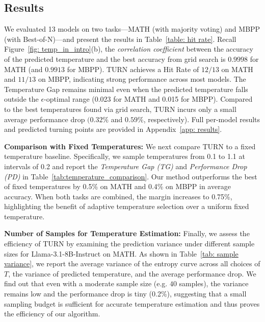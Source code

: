 \subsection{Results}  
We evaluated 13 models on two tasks—MATH (with majority voting) and MBPP (with Best-of-N)—and present the results in Table~\ref{table: hit rate}. Recall Figure~\ref{fig: temp_in_intro}(b), the \emph{correlation coefficient} between the accuracy of the predicted temperature and the best accuracy from grid search is $0.9998$ for MATH (and $0.9913$ for MBPP). \textsc{TURN} achieves a Hit Rate of \(12/13\) on MATH and \(11/13\) on MBPP, indicating strong performance across most models. The Temperature Gap remains minimal even when the predicted temperature falls outside the $\epsilon$-optimal range (0.023 for MATH and 0.015 for MBPP). Compared to the best temperatures found via grid search, \textsc{TURN} incurs only a small average performance drop \((0.32\%\) and \(0.59\%\), respectively). Full per-model results and predicted turning points are provided in Appendix~\ref{app: results}.

\textbf{Comparison with Fixed Temperatures:} 
We next compare \textsc{TURN} to a fixed temperature baseline. Specifically, we sample temperatures from 0.1 to 1.1 at intervals of 0.2 and report the \emph{Temperature Gap (TG)} and \emph{Performance Drop (PD)} in Table~\ref{tab:temperature_comparison}. Our method outperforms the best of fixed temperatures by 0.5\% on MATH and 0.4\% on MBPP in average accuracy. When both tasks are combined, the margin increases to 0.75\%, highlighting the benefit of adaptive temperature selection over a uniform fixed temperature.

\textbf{Number of Samples for Temperature Estimation:}
\label{sec: sample efficiency}
Finally, we assess the efficiency of \textsc{TURN} by examining the prediction variance under different sample sizes for Llama-3.1-8B-Instruct on MATH. As shown in Table~\ref{tab: sample variance}, we report the average variance of the entropy curve across all choices of \(T\), the variance of predicted temperature, and the average performance drop. We find out that even with a moderate sample size (e.g. $40$ samples), the variance remains low and the performance drop is tiny (0.2\%), suggesting that a small sampling budget is sufficient for accurate temperature estimation and thus proves the efficiency of our algorithm.


